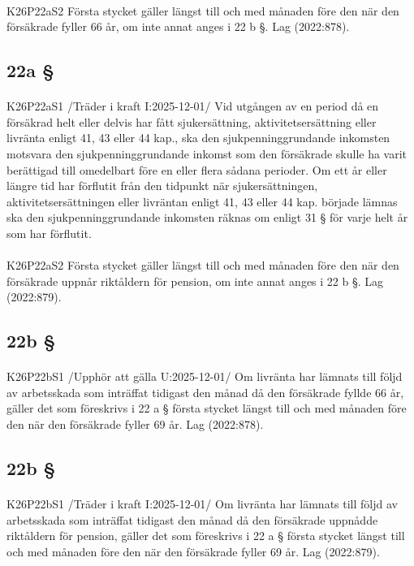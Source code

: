 \documentclass[a4paper,notitlepage,openany,10pt]{book}
\begin{document}
\paragraph*{}
{\tiny K26P22aS2}
Första stycket gäller längst till och med månaden före den när den försäkrade fyller 66 år, om inte annat anges i 22 b §.
Lag (2022:878).
\subsection*{22a §}
\paragraph*{}
{\tiny K26P22aS1}
/Träder i kraft I:2025-12-01/
Vid utgången av en period då en försäkrad helt eller delvis har fått sjukersättning, aktivitetsersättning eller livränta enligt 41, 43 eller 44 kap., ska den sjukpenninggrundande inkomsten motsvara den sjukpenninggrundande inkomst som den försäkrade skulle ha varit berättigad till omedelbart före en eller flera sådana perioder. Om ett år eller längre tid har förflutit från den tidpunkt när sjukersättningen, aktivitetsersättningen eller livräntan enligt 41, 43 eller 44 kap. började lämnas ska den sjukpenninggrundande inkomsten räknas om enligt 31 § för varje helt år som har förflutit.
\paragraph*{}
{\tiny K26P22aS2}
Första stycket gäller längst till och med månaden före den när den försäkrade uppnår riktåldern för pension, om inte annat anges i 22 b §.
Lag (2022:879).
\subsection*{22b §}
\paragraph*{}
{\tiny K26P22bS1}
/Upphör att gälla U:2025-12-01/
Om livränta har lämnats till följd av arbetsskada som inträffat tidigast den månad då den försäkrade fyllde 66 år, gäller det som föreskrivs i 22 a § första stycket längst till och med månaden före den när den försäkrade fyller 69 år.
Lag (2022:878).
\subsection*{22b §}
\paragraph*{}
{\tiny K26P22bS1}
/Träder i kraft I:2025-12-01/
Om livränta har lämnats till följd av arbetsskada som inträffat tidigast den månad då den försäkrade uppnådde riktåldern för pension, gäller det som föreskrivs i 22 a § första stycket längst till och med månaden före den när den försäkrade fyller 69 år.
Lag (2022:879).
\end{document}
